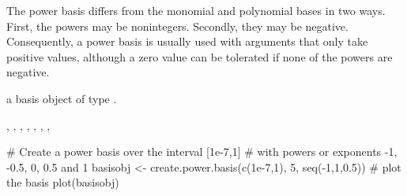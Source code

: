 \documentclass{article}
\begin{document}
\begin{Details}\relax
The power basis differs from the monomial and polynomial
bases in two ways.  First, the powers may be nonintegers.
Secondly, they may be negative.  Consequently, a power
basis is usually used with arguments that only take
positive values, although a zero value can be tolerated
if none of the powers are negative.
\end{Details}
\begin{Value}
a basis object of type .
\end{Value}
\begin{SeeAlso}\relax
{}, 
, 
, 
, 
, 
, 
, 
\end{SeeAlso}
\begin{Examples}
\begin{ExampleCode}

#  Create a power basis over the interval [1e-7,1]
#  with powers or exponents -1, -0.5, 0, 0.5 and 1
basisobj <- create.power.basis(c(1e-7,1), 5, seq(-1,1,0.5))
#  plot the basis
plot(basisobj)

\end{ExampleCode}
\end{Examples}
\end{document}
